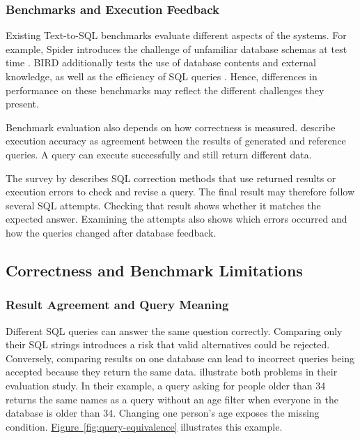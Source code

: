 \subsubsection{Benchmarks and Execution Feedback}

Existing Text-to-SQL benchmarks evaluate different aspects of the systems.
For example, Spider introduces the challenge of unfamiliar database schemas at test time \citep{yu2018spider}.
BIRD additionally tests the use of database contents and external knowledge, 
as well as the efficiency of SQL queries \citep{li2023bird}.
Hence, differences in performance on these benchmarks may reflect the different challenges they present.

Benchmark evaluation also depends on how correctness is measured.
\citet{gao2024benchmark} describe execution accuracy as agreement
between the results of generated and reference queries.
A query can execute successfully and still return different data.

The survey by \citet{shi2025survey} describes SQL correction methods
that use returned results or execution errors to check and revise a query.
The final result may therefore follow several SQL attempts.
Checking that result shows whether it matches the expected answer.
Examining the attempts also shows which errors occurred and how
the queries changed after database feedback.

\subsection{Correctness and Benchmark Limitations}
\label{sec:literature-correctness}

\subsubsection{Result Agreement and Query Meaning}

Different SQL queries can answer the same question correctly.
Comparing only their SQL strings introduces a risk that valid alternatives could be rejected.
Conversely, comparing results on one database can lead to incorrect queries being accepted 
because they return the same data.
\citet{zhong2020semantic} illustrate both problems in their evaluation study.
In their example, a query asking for people older than 34 returns the same
names as a query without an age filter when everyone in the database is
older than 34. Changing one person's age exposes the missing condition.
\hyperref[fig:query-equivalence]{Figure~\ref*{fig:query-equivalence}}
illustrates this example.

